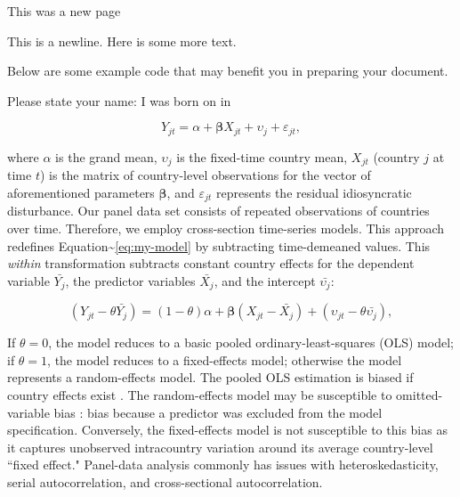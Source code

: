 \documentclass[]{article}
\begin{document}
\newpage

This was a new page

This is a newline. \newline  Here is some more text.

Below are some example code that may benefit you in preparing your
document. \newline

\vspace{0.25in}

\noindent Please state your name: \hrulefill \newline I was born on
\hrulefill in \hrulefill \vspace{0.25in}

\begin{equation}
\label{eq:my-model}
    Y_{jt} = \alpha + \bm{\beta}X_{jt} + \upsilon_{j}  + \varepsilon_{jt} ,
\end{equation}

\noindent where \(\alpha\) is the grand mean, \(\upsilon_{j}\) is the
fixed-time country mean, \(X_{jt}\) (country \(j\) at time \(t\)) is the
matrix of country-level observations for the vector of aforementioned
parameters \(\bm{\beta}\), and \(\varepsilon_{jt}\) represents the
residual idiosyncratic disturbance. Our panel data set consists of
repeated observations of countries over time. Therefore, we employ
cross-section time-series models. This approach redefines
Equation\textasciitilde{}\ref{eq:my-model} by subtracting time-demeaned
values. This \emph{within} transformation subtracts constant country
effects for the dependent variable \(\bar{Y_{j}}\), the predictor
variables \(\bar{X_{j}}\), and the intercept \(\bar{\upsilon_{j}}\):

\begin{equation}
\label{eq:my-random}
    (Y_{jt} - \theta \bar{Y_{j}}) = (1-\theta)\alpha + \bm{\beta}(X_{jt} - \bar{X_{j}}) +  (\upsilon_{jt} - \theta \bar{\upsilon_{j}})  ,
\end{equation}

\noindent If \(\theta = 0\), the model reduces to a basic pooled
ordinary-least-squares (OLS) model; if \(\theta = 1\), the model reduces
to a fixed-effects model; otherwise the model represents a
random-effects model. The pooled OLS estimation is biased if country
effects exist \citep{Hsiao:2003}. The random-effects model may be
susceptible to omitted-variable bias \citep{Wooldridge:2006}: bias
because a predictor was excluded from the model specification.
Conversely, the fixed-effects model is not susceptible to this bias as
it captures unobserved intracountry variation around its average
country-level ``fixed effect." Panel-data analysis commonly has issues
with heteroskedasticity, serial autocorrelation, and cross-sectional
autocorrelation.
\end{document}
